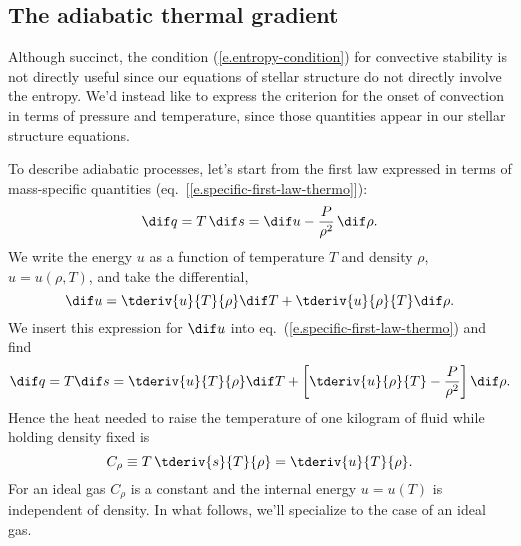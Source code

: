 \subsection{The adiabatic thermal gradient}\label{s.adiabatic-gradient}

Although succinct, the condition (\ref{e.entropy-condition}) for convective stability is not directly useful since our equations of stellar structure do not directly involve the entropy. We'd instead like to express the criterion for the onset of convection in terms of pressure and temperature, since those quantities appear in our stellar structure equations. 

\begin{sidebar}
\label{sb.adiabatic-changes}
To describe adiabatic processes, let's start from the first law expressed in terms of mass-specific quantities (eq.~[\ref{e.specific-first-law-thermo}]):
\[
	\dif q = T\,\dif s = \dif u -\frac{P}{\rho^{2}}\,\dif \rho.
\]
We write the energy $u$ as a function of temperature $T$ and density $\rho$, $u = u(\rho,T)$, and take the differential,
\[ \dif u = \tderiv{u}{T}{\rho}\dif T + \tderiv{u}{\rho}{T}\dif \rho. \]
We insert this expression for $\dif u$ into eq.~(\ref{e.specific-first-law-thermo}) and find
\[ \dif q = T\dif s = \tderiv{u}{T}{\rho}\dif T + \left[\tderiv{u}{\rho}{T} - \frac{P}{\rho^{2}}\right]\dif \rho. \]
Hence the heat needed to raise the temperature of one kilogram of fluid while holding density fixed is
\begin{equation}\label{e.CV}
C_{\rho} \equiv T\,\tderiv{s}{T}{\rho} = \tderiv{u}{T}{\rho}.
\end{equation}
For an ideal gas $C_{\rho}$ is a constant and the internal energy $u = u(T)$ is independent of density. In what follows, we'll specialize to the case of an ideal gas.


\end{sidebar}
